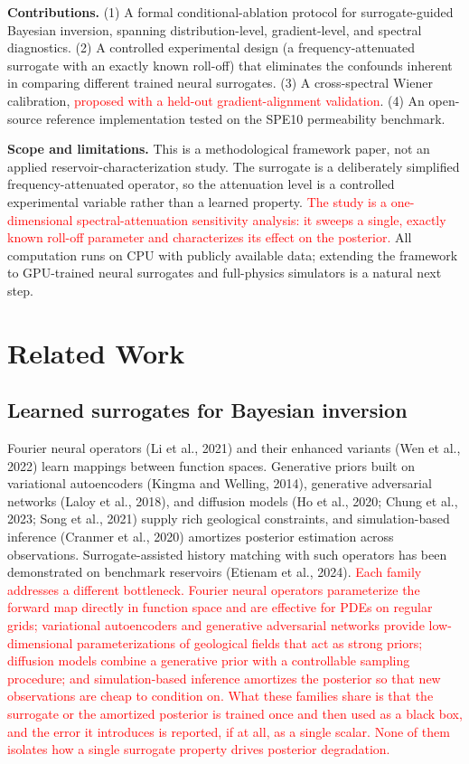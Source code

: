 \documentclass[12pt]{article}
\newcommand{\add}[1]{\textcolor{red}{#1}}
\begin{document}
\textbf{Contributions.} (1) A formal conditional-ablation protocol for surrogate-guided Bayesian inversion, spanning distribution-level, gradient-level, and spectral diagnostics. (2) A controlled experimental design (a frequency-attenuated surrogate with an exactly known roll-off) that eliminates the confounds inherent in comparing different trained neural surrogates. (3) A cross-spectral Wiener calibration, \add{proposed with a held-out gradient-alignment validation}. (4) An open-source reference implementation tested on the SPE10 permeability benchmark.

\textbf{Scope and limitations.} This is a methodological framework paper, not an applied reservoir-characterization study. The surrogate is a deliberately simplified frequency-attenuated operator, so the attenuation level is a controlled experimental variable rather than a learned property. \add{The study is a one-dimensional spectral-attenuation sensitivity analysis: it sweeps a single, exactly known roll-off parameter and characterizes its effect on the posterior.} All computation runs on CPU with publicly available data; extending the framework to GPU-trained neural surrogates and full-physics simulators is a natural next step.

\section{Related Work}

\subsection{Learned surrogates for Bayesian inversion}

Fourier neural operators (Li et al., 2021) and their enhanced variants (Wen et al., 2022) learn mappings between function spaces. Generative priors built on variational autoencoders (Kingma and Welling, 2014), generative adversarial networks (Laloy et al., 2018), and diffusion models (Ho et al., 2020; Chung et al., 2023; Song et al., 2021) supply rich geological constraints, and simulation-based inference (Cranmer et al., 2020) amortizes posterior estimation across observations. Surrogate-assisted history matching with such operators has been demonstrated on benchmark reservoirs (Etienam et al., 2024). \add{Each family addresses a different bottleneck. Fourier neural operators parameterize the forward map directly in function space and are effective for PDEs on regular grids; variational autoencoders and generative adversarial networks provide low-dimensional parameterizations of geological fields that act as strong priors; diffusion models combine a generative prior with a controllable sampling procedure; and simulation-based inference amortizes the posterior so that new observations are cheap to condition on. What these families share is that the surrogate or the amortized posterior is trained once and then used as a black box, and the error it introduces is reported, if at all, as a single scalar. None of them isolates how a single surrogate property drives posterior degradation.}
\end{document}
